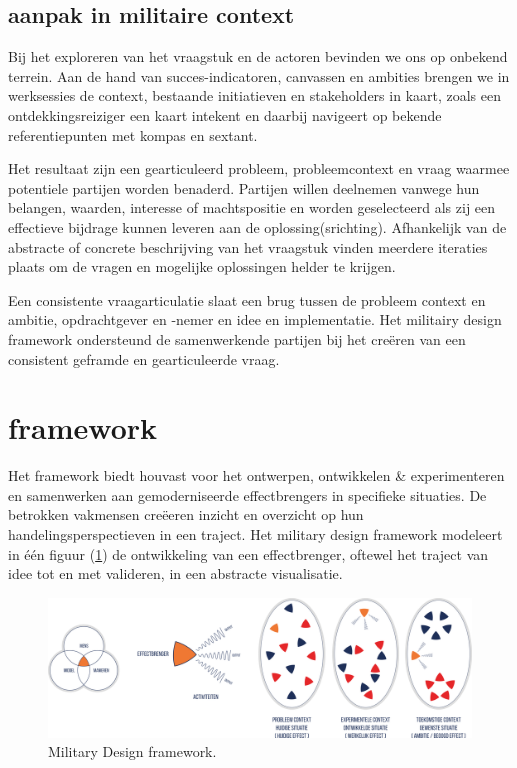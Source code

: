 \documentclass[
]{book}
\begin{document}
\hypertarget{aanpak-in-militaire-context}{%
\subsection{aanpak in militaire context}\label{aanpak-in-militaire-context}}

Bij het exploreren van het vraagstuk en de actoren bevinden we ons op onbekend terrein. Aan de hand van succes-indicatoren, canvassen en ambities brengen we in werksessies de context, bestaande initiatieven en stakeholders in kaart, zoals een ontdekkingsreiziger een kaart intekent en daarbij navigeert op bekende referentiepunten met kompas en sextant.

Het resultaat zijn een gearticuleerd probleem, probleemcontext en vraag waarmee potentiele partijen worden benaderd. Partijen willen deelnemen vanwege hun belangen, waarden, interesse of machtspositie en worden geselecteerd als zij een effectieve bijdrage kunnen leveren aan de oplossing(srichting). Afhankelijk van de abstracte of concrete beschrijving van het vraagstuk vinden meerdere iteraties plaats om de vragen en mogelijke oplossingen helder te krijgen.

Een consistente vraagarticulatie slaat een brug tussen de probleem context en ambitie, opdrachtgever en -nemer en idee en implementatie. Het militairy design framework ondersteund de samenwerkende partijen bij het creëren van een consistent geframde en gearticuleerde vraag.

\hypertarget{framework}{%
\section{framework}\label{framework}}

Het framework biedt houvast voor het ontwerpen, ontwikkelen \& experimenteren en samenwerken aan gemoderniseerde effectbrengers in specifieke situaties. De betrokken vakmensen creëeren inzicht en overzicht op hun handelingsperspectieven in een traject. Het military design framework modeleert in één figuur (\ref{fig:design-model}) de ontwikkeling van een effectbrenger, oftewel het traject van idee tot en met valideren, in een abstracte visualisatie.

\begin{figure}
\includegraphics[width=51.79in]{data/images/20210324-MDI-design-model} \caption{Military Design framework.}\label{fig:design-model}
\end{figure}
\end{document}
